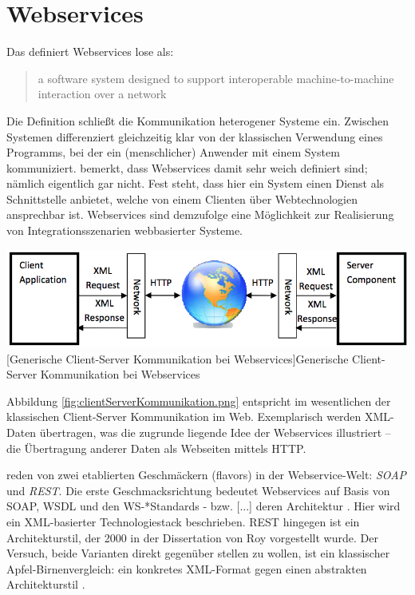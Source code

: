 \documentclass[11pt, a4paper, titlepage, listof=totoc, bibliography=totoc, index=totoc, twoside, openright, headings=normal, draft]{scrreprt}
\begin{document}
\section{Webservices}
\label{Webservices}

Das \citet	{w3c04} definiert Webservices lose als:

\begin{quote}
\glqq [...] a software system designed to support interoperable machine-to-machine interaction over a network\grqq
\end{quote}

Die Definition schließt die Kommunikation heterogener Systeme ein. \glqq Zwischen Systemen\grqq{} differenziert gleichzeitig klar von der klassischen Verwendung eines Programms, bei der ein (menschlicher) Anwender mit einem System kommuniziert. \citet{tilkov11} bemerkt, dass Webservices damit sehr weich definiert sind; \glqq nämlich eigentlich gar nicht\grqq{}. Fest steht, dass hier ein System einen Dienst als Schnittstelle anbietet, welche von einem Clienten über Webtechnologien ansprechbar ist. Webservices sind demzufolge eine Möglichkeit zur Realisierung von Integrationsszenarien webbasierter Systeme.

\vspace{1em}
\begin{minipage}{\linewidth}
	\centering
	\includegraphics[width=0.7\linewidth]{Abbildungen/clientServerKommunikation.png}
	[Generische Client-Server Kommunikation bei Webservices]{Generische Client-Server Kommunikation bei Webservices}
	\label{fig:clientServerKommunikation.png}
\end{minipage}
\vspace{1em}

Abbildung \ref{fig:clientServerKommunikation.png} entspricht im wesentlichen der klassischen Client-Server Kommunikation im Web. Exemplarisch werden XML-Daten übertragen, was die zugrunde liegende Idee der Webservices illustriert -- die Übertragung anderer Daten als Webseiten mittels HTTP.

\citet{wilde11} reden von zwei etablierten \glqq Geschmäckern\grqq{} (flavors) in der Webservice-Welt: \emph{SOAP} und \emph{REST}. Die erste Geschmacksrichtung bedeutet Webservices \glqq auf Basis von SOAP, WSDL und den WS-*Standards - bzw. [...] deren Architektur\grqq{} \citep{tilkov11}. Hier wird ein XML-basierter Technologiestack beschrieben. REST hingegen ist ein Architekturstil, der 2000 in der Dissertation von Roy \citeauthor{fielding00} vorgestellt wurde. Der Versuch, beide Varianten direkt gegenüber stellen zu wollen, ist ein \glqq [...] klassischer Apfel-Birnenvergleich: ein konkretes XML-Format gegen einen abstrakten Architekturstil\grqq{} \citep{tilkov11}.
\end{document}
